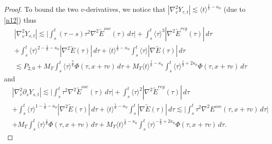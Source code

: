 \documentclass[10pt,a4paper]{amsart}
\theoremstyle{plain}
\begin{document}
\begin{proof}
	To bound the two $v$-derivatives, we notice that $|\nabla_v^2Y_{\tau,t}|\lesssim \langle t\rangle^{\frac16-\kappa_0}$ (due to \eqref{n12}) thus
	\begin{equation}\label{Ysu6}
		\begin{split}
			&|\nabla_v^2Y_{s,t}|\lesssim\Big|\int_s^t(\tau-s)\tau^2\nabla^2\widetilde E^{osc}(\tau)\,d\tau\Big|
			+\int_s^t\langle\tau\rangle^3|\nabla^2\widetilde E^{reg}(\tau)|\,d\tau\\
			&+\int_s^t\langle\tau\rangle^{2-\frac16-\kappa_0}|\nabla^2\widetilde E(\tau)|\,d\tau+
			\langle t\rangle^{\frac16-\kappa_0}\int_s^t\langle\tau\rangle|\nabla\widetilde E(\tau)|\,d\tau\\
			&\lesssim
			P_{2,0}+M_T\int_s^t
			\langle\tau\rangle^{\frac76}
			\Phi(\tau,x+\tau v)\,d\tau+	M_T\langle t\rangle^{\frac16-\kappa_0}
			\int_s^t
			\langle\tau\rangle^{\frac13+2\kappa_0}
			\Phi(\tau,x+\tau v)\,d\tau
		\end{split}
	\end{equation}
	and
	\begin{equation}\label{Ysu7}
		\begin{split}
			&|\nabla_v^2\partial_sY_{s,t}|\lesssim\Big|\int_s^t\tau^2\nabla^2\widetilde E^{osc}(\tau)\,d\tau\Big|
			+\int_s^t\langle\tau\rangle^2|\nabla^2\widetilde E^{reg}(\tau)|\,d\tau\\
			&+\int_s^t\langle\tau\rangle^{1-\frac16-\kappa_0}|\nabla^2\widetilde E(\tau)|\,d\tau+
			\langle t\rangle^{\frac16-\kappa_0}
			\int_s^t|\nabla\widetilde E(\tau)|\,d\tau\lesssim\Big|\int_s^t\tau^2\nabla^2E^{osc}(\tau,x+\tau v)\,d\tau\Big|\\
			&+M_T\int_s^t\langle\tau\rangle^{\frac16}\Phi(\tau,x+\tau v)\,d\tau+M_T\langle t\rangle^{\frac16-\kappa_0}\int_s^t\langle\tau\rangle^{-\frac23+2\kappa_0}\Phi(\tau,x+\tau v)\,d\tau.
		\end{split}
	\end{equation}
	

\end{proof}
\end{document}
